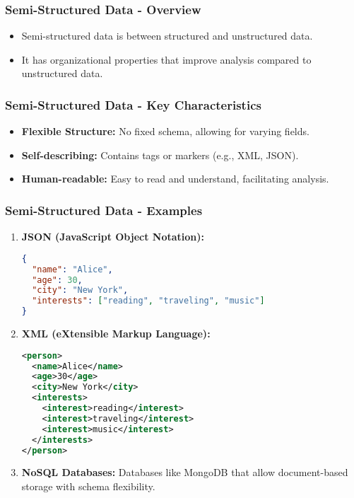 \documentclass[aspectratio=169]{beamer}
\begin{document}
\begin{frame}[fragile]
    \frametitle{Semi-Structured Data - Overview}
    \begin{itemize}
        \item Semi-structured data is between structured and unstructured data.
        \item It has organizational properties that improve analysis compared to unstructured data.
    \end{itemize}
\end{frame}

\begin{frame}[fragile]
    \frametitle{Semi-Structured Data - Key Characteristics}
    \begin{itemize}
        \item \textbf{Flexible Structure:} No fixed schema, allowing for varying fields.
        \item \textbf{Self-describing:} Contains tags or markers (e.g., XML, JSON).
        \item \textbf{Human-readable:} Easy to read and understand, facilitating analysis.
    \end{itemize}
\end{frame}

\begin{frame}[fragile]
    \frametitle{Semi-Structured Data - Examples}
    \begin{enumerate}
        \item \textbf{JSON (JavaScript Object Notation):}
        \begin{lstlisting}[language=json]
{
  "name": "Alice",
  "age": 30,
  "city": "New York",
  "interests": ["reading", "traveling", "music"]
}
        \end{lstlisting}

        \item \textbf{XML (eXtensible Markup Language):}
        \begin{lstlisting}[language=xml]
<person>
  <name>Alice</name>
  <age>30</age>
  <city>New York</city>
  <interests>
    <interest>reading</interest>
    <interest>traveling</interest>
    <interest>music</interest>
  </interests>
</person>
        \end{lstlisting}
        
        \item \textbf{NoSQL Databases:} 
        Databases like MongoDB that allow document-based storage with schema flexibility.
    \end{enumerate}
\end{frame}
\end{document}

